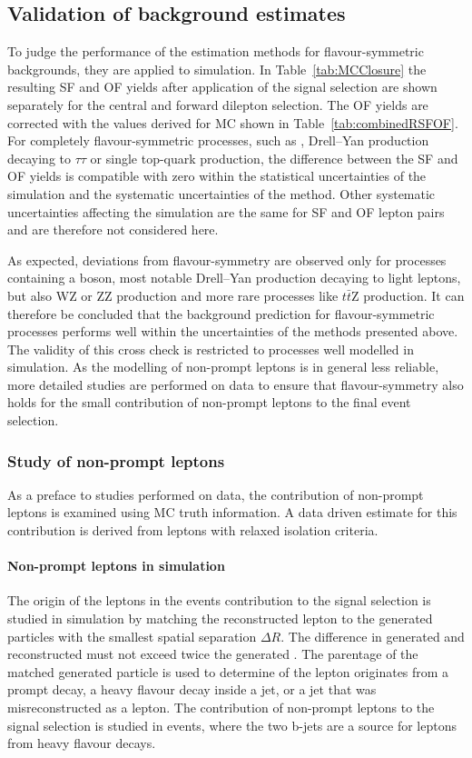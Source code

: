 \subsection{Validation of background estimates}
To judge the performance of the estimation methods for flavour-symmetric backgrounds, they are applied to simulation. In Table~\ref{tab:MCClosure} the resulting SF and OF yields after application of the signal selection are shown separately for the central and forward dilepton selection. The OF yields are corrected with the \Rsfof values derived for MC shown in Table~\ref{tab:combinedRSFOF}. For completely flavour-symmetric processes, such as \ttbar, Drell--Yan production decaying to $\tau\tau$ or single top-quark production, the difference between the SF and OF yields is compatible with zero within the statistical uncertainties of the simulation and the systematic uncertainties of the method. Other systematic uncertainties affecting the simulation are the same for SF and OF lepton pairs and are therefore not considered here. 

 As expected, deviations from flavour-symmetry are observed only for processes containing a \Z boson, most notable Drell--Yan production decaying to light leptons, but also WZ or ZZ production and more rare processes like $t\bar{t}$Z production. It can therefore be concluded that the background prediction for flavour-symmetric processes performs well within the uncertainties of the methods presented above. The validity of this cross check is restricted to processes well modelled in simulation. As the modelling of non-prompt leptons is in general less reliable, more detailed studies are performed on data to ensure that flavour-symmetry also holds for the small contribution of non-prompt leptons to the final event selection.
\subsubsection*{Study of non-prompt leptons}
As a preface to studies performed on data, the contribution of non-prompt leptons is examined using MC truth information. A data driven estimate for this contribution is derived from leptons with relaxed isolation criteria.
\paragraph*{Non-prompt leptons in simulation}
The origin of the leptons in the events contribution to the signal selection is studied in simulation by matching the reconstructed lepton to the generated particles with the smallest spatial separation $\Delta R$. The difference in generated and reconstructed \pt must not exceed twice the generated \pt. The parentage of the matched generated particle is used to determine of the lepton originates from a prompt decay, a heavy flavour decay inside a jet, or a jet that was misreconstructed as a lepton. The contribution of non-prompt leptons to the signal selection is studied in \ttbar events, where the two b-jets are a source for leptons from heavy flavour decays. 

